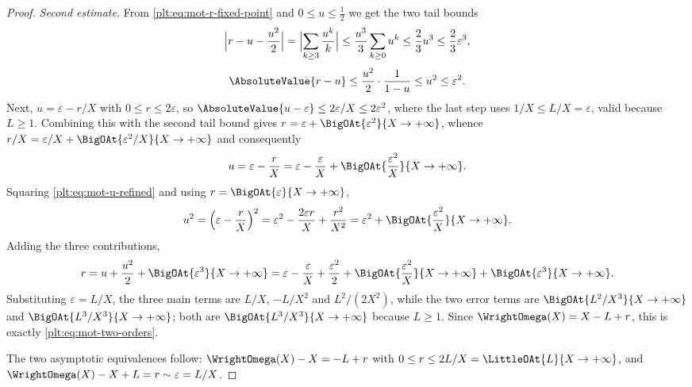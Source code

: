 \documentclass[11pt,oneside]{article}
\theoremstyle{plain}
\theoremstyle{definition}
\theoremstyle{remark}
\begin{document}
\begin{proof}
\emph{Second estimate.}  From \eqref{plt:eq:mot-r-fixed-point} and
\(0\le u\le\tfrac12\) we get the two tail bounds
\[
  \Bigl|r-u-\frac{u^{2}}{2}\Bigr|
  =\Bigl|\sum_{k\ge3}\frac{u^{k}}{k}\Bigr|
  \le\frac{u^{3}}{3}\sum_{k\ge0}u^{k}
  \le\frac{2}{3}u^{3}\le\frac{2}{3}\varepsilon^{3},
\]
\[
  \AbsoluteValue{r-u}
  \le\frac{u^{2}}{2}\cdot\frac{1}{1-u}\le u^{2}\le\varepsilon^{2}.
\]
Next, \(u=\varepsilon-r/X\) with \(0\le r\le2\varepsilon\), so
\(\AbsoluteValue{u-\varepsilon}\le2\varepsilon/X\le2\varepsilon^{2}\), where the
last step uses \(1/X\le L/X=\varepsilon\), valid because \(L\ge1\).  Combining
this with the second tail bound gives
\(r=\varepsilon+\BigOAt{\varepsilon^{2}}{X\to+\infty}\), whence
\(r/X=\varepsilon/X+\BigOAt{\varepsilon^{2}/X}{X\to+\infty}\) and consequently
\begin{equation}\label{plt:eq:mot-u-refined}
  u=\varepsilon-\frac{r}{X}
   =\varepsilon-\frac{\varepsilon}{X}
    +\BigOAt{\frac{\varepsilon^{2}}{X}}{X\to+\infty}.
\end{equation}
Squaring \eqref{plt:eq:mot-u-refined} and using \(r=\BigOAt{\varepsilon}{X\to+\infty}\),
\[
  u^{2}=\Bigl(\varepsilon-\frac{r}{X}\Bigr)^{2}
       =\varepsilon^{2}-\frac{2\varepsilon r}{X}+\frac{r^{2}}{X^{2}}
       =\varepsilon^{2}+\BigOAt{\frac{\varepsilon^{2}}{X}}{X\to+\infty}.
\]
Adding the three contributions,
\[
  r=u+\frac{u^{2}}{2}+\BigOAt{\varepsilon^{3}}{X\to+\infty}
   =\varepsilon-\frac{\varepsilon}{X}+\frac{\varepsilon^{2}}{2}
    +\BigOAt{\frac{\varepsilon^{2}}{X}}{X\to+\infty}
    +\BigOAt{\varepsilon^{3}}{X\to+\infty}.
\]
Substituting \(\varepsilon=L/X\), the three main terms are \(L/X\),
\(-L/X^{2}\) and \(L^{2}/(2X^{2})\), while the two error terms are
\(\BigOAt{L^{2}/X^{3}}{X\to+\infty}\) and
\(\BigOAt{L^{3}/X^{3}}{X\to+\infty}\); both are
\(\BigOAt{L^{3}/X^{3}}{X\to+\infty}\) because \(L\ge1\).  Since
\(\WrightOmega(X)=X-L+r\), this is exactly \eqref{plt:eq:mot-two-orders}.

The two asymptotic equivalences follow: \(\WrightOmega(X)-X=-L+r\) with
\(0\le r\le2L/X=\LittleOAt{L}{X\to+\infty}\), and
\(\WrightOmega(X)-X+L=r\sim\varepsilon=L/X\).
\end{proof}
\end{document}
